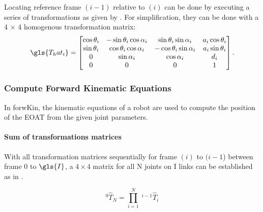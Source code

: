 Locating reference frame $(i-1)$ relative to $(i)$ can be done by executing a series of transformations as given by  . 
For simplification, they can be done with a 4 × 4 homogenous transformation matrix:
\begin{equation}\label{eq:TransformationMarix}
\gls{T_hat_i}= %
\begin{bmatrix}
\cos\theta_i & -\sin\theta_i  \cos\alpha_i & \sin\theta_i  \sin\alpha_i & a_i  \cos\theta_i \\
\sin\theta_i & \cos\theta_i  \cos\alpha_i & -\cos\theta_i  \sin\alpha_i & a_i  \sin\theta_i \\ %
0 & \sin\alpha_i & \cos\alpha_i & d_i \\
0 & 0 & 0 & 1 \\
\end{bmatrix}.
\end{equation}



\subsubsection{Compute Forward Kinematic Equations} \label{ForKinEq}
In \gls{forwKin}, the kinematic equations of a robot are used to compute the position of the \ac{EOAT} from the given joint parameters.

\paragraph{Sum of transformations matrices}
With all transformation matrices sequentially for frame $(i)$ to $(i-1$) between frame $0$ to $\gls{I}$, a $4\times4$ matrix for all \gls{N} joints on \gls{I} links can be established as in \cite{ConstantinForwardKA}.

\begin{equation} \label{eq:SummofTranfMatr}
^0\hat{T}_N=\prod_{i=1}^{N} \phantom{.}^{i-1}\hat{T}_i
\end{equation}



